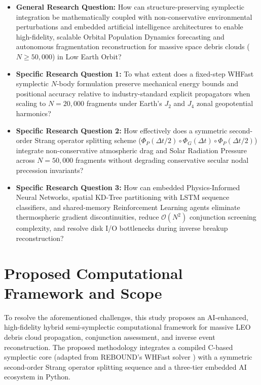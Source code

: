 \begin{itemize}
    \item \textbf{General Research Question:} How can structure-preserving symplectic integration be mathematically coupled with non-conservative environmental perturbations and embedded artificial intelligence architectures to enable high-fidelity, scalable Orbital Population Dynamics forecasting and autonomous fragmentation reconstruction for massive space debris clouds ($N \ge 50,000$) in Low Earth Orbit?
    \item \textbf{Specific Research Question 1:} To what extent does a fixed-step WHFast symplectic $N$-body formulation preserve mechanical energy bounds and positional accuracy relative to industry-standard explicit propagators when scaling to $N = 20,000$ fragments under Earth's $J_2$ and $J_4$ zonal geopotential harmonics?
    \item \textbf{Specific Research Question 2:} How effectively does a symmetric second-order Strang operator splitting scheme ($\Phi_P(\Delta t/2) \circ \Phi_G(\Delta t) \circ \Phi_P(\Delta t/2)$) integrate non-conservative atmospheric drag and Solar Radiation Pressure across $N = 50,000$ fragments without degrading conservative secular nodal precession invariants?
    \item \textbf{Specific Research Question 3:} How can embedded Physics-Informed Neural Networks, spatial KD-Tree partitioning with LSTM sequence classifiers, and shared-memory Reinforcement Learning agents eliminate thermospheric gradient discontinuities, reduce $\mathcal{O}(N^2)$ conjunction screening complexity, and resolve disk I/O bottlenecks during inverse breakup reconstruction?
\end{itemize}

\section{Proposed Computational Framework and Scope}
\label{sec:occupying_niche}

To resolve the aforementioned challenges, this study proposes an AI-enhanced, high-fidelity hybrid semi-symplectic computational framework for massive LEO debris cloud propagation, conjunction assessment, and inverse event reconstruction. The proposed methodology integrates a compiled C-based symplectic core (adapted from REBOUND's WHFast solver \cite{ReinLiu2012, rein_whfast_2015}) with a symmetric second-order Strang operator splitting sequence and a three-tier embedded AI ecosystem in Python.

